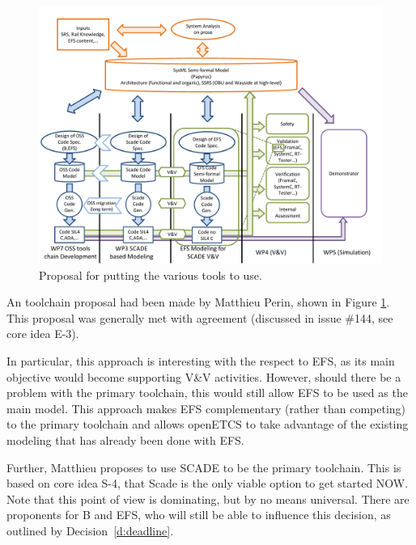 \begin{figure}
  \centering
  \includegraphics[width=\linewidth]{images/2013_08_28_Toolchain_proposal.pdf}
  \caption{Proposal for putting the various tools to use.}
  \label{fig:proposal}
\end{figure}

An toolchain proposal had been made by Matthieu Perin, shown in Figure \ref{fig:proposal}.  This proposal was generally met with agreement (discussed in issue \#144, see core idea E-3).

In particular, this approach is interesting with the respect to EFS, as its main objective would become supporting V\&V activities.  However, should there be a problem with the primary toolchain, this would still allow EFS to be used as the main model.  This approach makes EFS complementary (rather than competing) to the primary toolchain and allows openETCS to take advantage of the existing modeling that has already been done with EFS.


Further, Matthieu proposes to use SCADE to be the primary toolchain.  This is based on core idea S-4, that Scade is the only viable option to get started NOW.  Note that this point of view is dominating, but by no means universal.  There are proponents for B and EFS, who will still be able to influence this decision, as outlined by Decision~\ref{d:deadline}.

